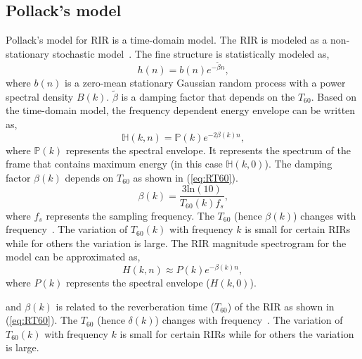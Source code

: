 \subsection{Pollack's model}
\label{sec:Pollacks_model}
Pollack's model for RIR is a time-domain model. The RIR is modeled as a non-stationary stochastic model~\cite{wen2008blind,kuttruff2016room}. The fine structure is statistically modeled as, 
\begin{equation}
h(n)=b(n)e^{-\tilde{\beta}n} \text{,}
\end{equation}
where $b(n)$ is a zero-mean stationary Gaussian random process with a power spectral density $B(k)$. $\tilde{\beta}$ is a damping factor that depends on the $T_{60}$. Based on the time-domain model, the frequency dependent energy envelope can be written as,
\begin{equation}
\mathbb{H}(k,n) = \mathbb{P}(k) e^{-2\beta(k)n}\text{,}
\end{equation}
where $\mathbb{P}(k)$ represents the spectral envelope. It represents the spectrum of the frame that contains maximum energy (in this case $\mathbb{H}(k,0)$). The damping factor $\beta(k)$ depends on $T_{60}$ as shown in (\ref{eq:RT60}). 
\begin{equation}
\beta (k)= \dfrac{3\text{ln}(10)}{T_{60}(k) f_s}\text{,}
\label{eq:RT60}
\end{equation}
where $f_s$ represents the sampling frequency. The $T_{60}$ (hence $\beta (k)$) changes with frequency~\cite{jeub2010we}. The variation of $T_{60}(k)$ with frequency $k$ is small for certain RIRs while for others the variation is large. 
The RIR magnitude spectrogram for the model can be approximated as,
\begin{equation}
H(k,n)\approx P(k) e^{- \beta(k) n},
\label{eq:PollackModel}
\end{equation} 
where $P(k)$ represents the spectral envelope ($H(k,0)$). 

\iffalse
and $\beta(k)$ is related to the reverberation time ($T_{60}$) of the RIR as shown in (\ref{eq:RT60}). The $T_{60}$ (hence $\delta (k)$) changes with frequency~\cite{jeub2010we}. The variation of $T_{60}(k)$ with frequency $k$ is small for certain RIRs while for others the variation is large.

